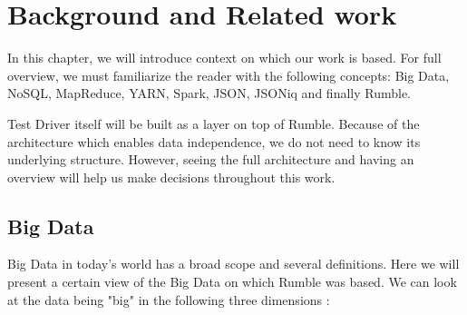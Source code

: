 \chapter{Background and Related work}
In this chapter, we will introduce context on which our work is based. For full overview, we must familiarize the reader with the following concepts: Big Data, NoSQL, MapReduce, YARN, Spark, JSON, JSONiq and finally Rumble.

Test Driver itself will be built as a layer on top of Rumble. Because of the architecture which enables data independence, we do not need to know its underlying structure. However, seeing the full architecture and having an overview will help us make decisions throughout this work.

\section{Big Data}
Big Data in today's world has a broad scope and several definitions. Here we will present a certain view of the Big Data on which Rumble was based. We can look at the data being "big" in the following three dimensions \cite{BigDataCourse}:%

